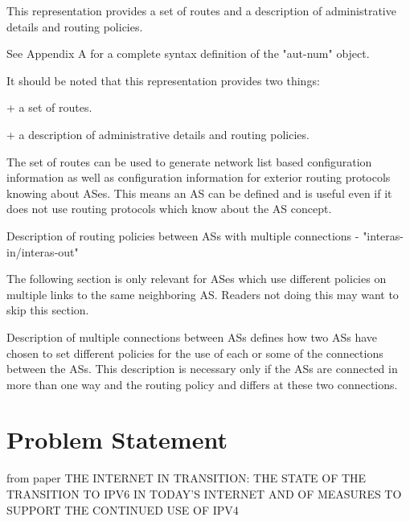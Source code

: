 \documentclass[11pt]{report}
\begin{document}
This representation provides a set of routes and a description of administrative details and routing policies. 
        
        
          
          
          
          


	See Appendix A for a complete syntax definition of the "aut-num"
   object.


   It should be noted that this representation provides two things:

       + a set of routes.

       + a description of administrative details and routing policies.

   The set of routes can be used to generate network list based
   configuration information as well as configuration information for
   exterior routing protocols knowing about ASes. This means an AS can
   be defined and is useful even if it does not use routing protocols
   which know about the AS concept.

   Description of routing policies between ASs with multiple connections
   - "interas-in/interas-out"

   The following section is only relevant for ASes which use different
   policies on multiple links to the same neighboring AS. Readers not
   doing this may want to skip this section.

   Description of multiple connections between ASs defines how two ASs
   have chosen to set different policies for the use of each or some of
   the connections between the ASs.  This description is necessary only
   if the ASs are connected in more than one way and the routing policy
   and differs at these two connections.

\section{Problem Statement}

from paper THE INTERNET IN TRANSITION: THE STATE OF THE TRANSITION TO IPV6 IN
TODAY'S INTERNET AND OF MEASURES TO SUPPORT THE CONTINUED USE OF
IPV4
\end{document}
